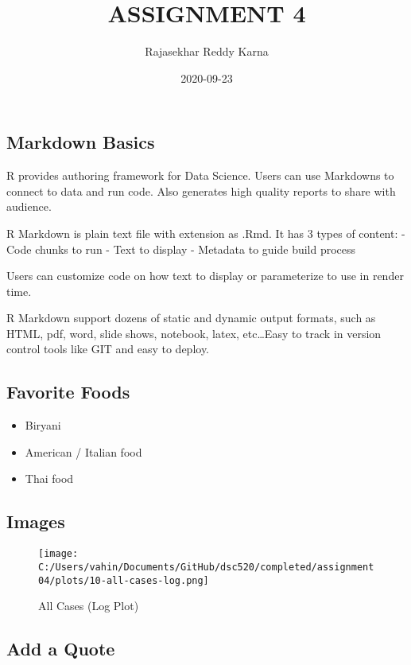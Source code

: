 \documentclass[
]{article}
\title{ASSIGNMENT 4}
\author{Rajasekhar Reddy Karna}
\date{2020-09-23}
\providecommand{\tightlist}{%
  \setlength{\itemsep}{0pt}\setlength{\parskip}{0pt}}
\begin{document}
\maketitle

\hypertarget{markdown-basics}{%
\subsection{Markdown Basics}\label{markdown-basics}}

R provides authoring framework for Data Science. Users can use Markdowns
to connect to data and run code. Also generates high quality reports to
share with audience.

R Markdown is plain text file with extension as .Rmd. It has 3 types of
content: - Code chunks to run - Text to display - Metadata to guide
build process

Users can customize code on how text to display or parameterize to use
in render time.

R Markdown support dozens of static and dynamic output formats, such as
HTML, pdf, word, slide shows, notebook, latex, etc\ldots Easy to track
in version control tools like GIT and easy to deploy.

\hypertarget{favorite-foods}{%
\subsection{Favorite Foods}\label{favorite-foods}}

\begin{itemize}
\tightlist
\item
  Biryani
\item
  American / Italian food
\item
  Thai food
\end{itemize}

\hypertarget{images}{%
\subsection{Images}\label{images}}

\begin{figure}
\centering
\texttt{[image: C:/Users/vahin/Documents/GitHub/dsc520/completed/assignment04/plots/10-all-cases-log.png]}
\caption{All Cases (Log Plot)}
\end{figure}

\hypertarget{add-a-quote}{%
\subsection{Add a Quote}\label{add-a-quote}}
\end{document}
